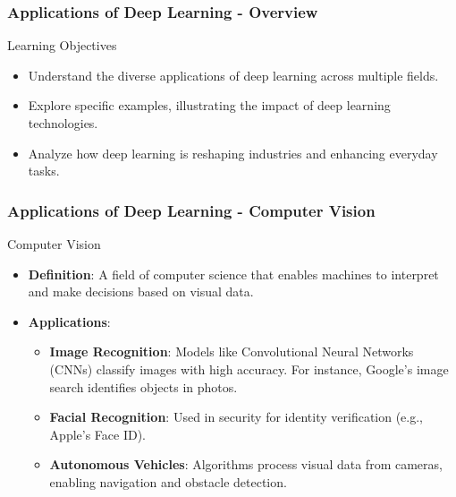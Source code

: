 \documentclass[aspectratio=169]{beamer}
\begin{document}
\begin{frame}[fragile]
    \frametitle{Applications of Deep Learning - Overview}
    \begin{block}{Learning Objectives}
        \begin{itemize}
            \item Understand the diverse applications of deep learning across multiple fields.
            \item Explore specific examples, illustrating the impact of deep learning technologies.
            \item Analyze how deep learning is reshaping industries and enhancing everyday tasks.
        \end{itemize}
    \end{block}
\end{frame}

\begin{frame}[fragile]
    \frametitle{Applications of Deep Learning - Computer Vision}
    \begin{block}{Computer Vision}
        \begin{itemize}
            \item \textbf{Definition}: A field of computer science that enables machines to interpret and make decisions based on visual data.
            \item \textbf{Applications}:
            \begin{itemize}
                \item \textbf{Image Recognition}: Models like Convolutional Neural Networks (CNNs) classify images with high accuracy. For instance, Google's image search identifies objects in photos.
                \item \textbf{Facial Recognition}: Used in security for identity verification (e.g., Apple's Face ID).
                \item \textbf{Autonomous Vehicles}: Algorithms process visual data from cameras, enabling navigation and obstacle detection.
            \end{itemize}
        \end{itemize}
    \end{block}
\end{frame}
\end{document}
